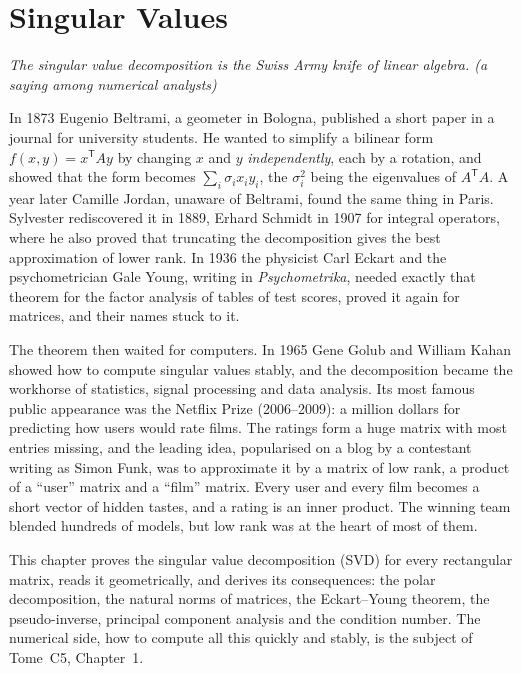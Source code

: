 \chapter{Singular Values}\label{ch:svd}

\begin{center}\itshape
The singular value decomposition is the Swiss Army knife of linear algebra.
\upshape(a saying among numerical analysts)
\end{center}

In 1873 Eugenio Beltrami, a geometer in Bologna, published a short paper in a journal for university students. He wanted
to simplify a bilinear form $f(x,y)=x^{\mathsf T}Ay$ by changing $x$ and $y$ \emph{independently}, each by a rotation, and
showed that the form becomes $\sum_i\sigma_ix_iy_i$, the $\sigma_i^2$ being the eigenvalues of $A^{\mathsf T}A$. A year later
Camille Jordan, unaware of Beltrami, found the same thing in Paris. Sylvester rediscovered it in 1889, Erhard Schmidt in
1907 for integral operators, where he also proved that truncating the decomposition gives the best approximation of
lower rank. In 1936 the physicist Carl Eckart and the psychometrician Gale Young, writing in \emph{Psychometrika}, needed
exactly that theorem for the factor analysis of tables of test scores, proved it again for matrices, and their names
stuck to it.

The theorem then waited for computers. In 1965 Gene Golub and William Kahan showed how to compute singular values stably,
and the decomposition became the workhorse of statistics, signal processing and data analysis. Its most famous public
appearance was the Netflix Prize (2006--2009): a million dollars for predicting how users would rate films. The ratings
form a huge matrix with most entries missing, and the leading idea, popularised on a blog by a contestant writing as Simon
Funk, was to approximate it by a matrix of low rank, a product of a ``user'' matrix and a ``film'' matrix. Every user and
every film becomes a short vector of hidden tastes, and a rating is an inner product. The winning team blended hundreds of
models, but low rank was at the heart of most of them.

This chapter proves the singular value decomposition (SVD) for every rectangular matrix, reads it geometrically, and
derives its consequences: the polar decomposition, the natural norms of matrices, the Eckart--Young theorem, the
pseudo-inverse, principal component analysis and the condition number. The numerical side, how to compute all this
quickly and stably, is the subject of Tome~C5, Chapter~1.

